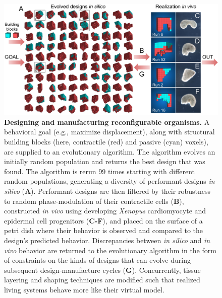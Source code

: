 \begin{figure}[t]
\centering
\includegraphics[width=\linewidth]{Chapter07/img/Fig1}
\caption{\textbf{Designing and manufacturing reconfigurable organisms.} A behavioral goal (e.g., maximize displacement), along with structural building blocks (here, contractile (red) and passive (cyan) voxels), are supplied to an evolutionary algorithm. The algorithm evolves an initially random population and returns the best design that was found. The algorithm is rerun 99 times starting with different random populations, generating a diversity of performant designs \textit{in silico} (\textbf{A}). Performant designs are then filtered by their robustness to random phase-modulation of their contractile cells (\textbf{B}), constructed \textit{in vivo} using developing \textit{Xenopus} cardiomyocyte and epidermal cell progenitors (\textbf{C-F}), and placed on the surface of a petri dish where their behavior is observed and compared to the design's predicted behavior. Discrepancies between \textit{in silico} and \textit{in vivo} behavior are returned to the evolutionary algorithm in the form of constraints on the kinds of designs that can evolve during subsequent design-manufacture cycles (\textbf{G}). Concurrently, tissue layering and shaping techniques are modified such that realized living systems behave more like their virtual model.
}
\end{figure}


